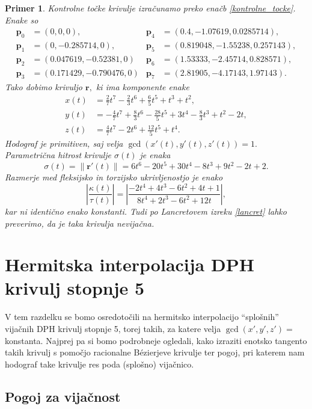 \documentclass[12pt,a4paper,twoside]{article}
\theoremstyle{definition} %
\theoremstyle{plain} %
\theoremstyle{primerstyle}
\newtheorem{primer}[definicija]{Primer}
\numberwithin{equation}{section}  %
\newcommand{\pV}{\mathbf{p}}
\newcommand{\rV}{\mathbf{r}}
\begin{document}
\begin{primer}
	Kontrolne točke krivulje izračunamo preko enačb \eqref{kontrolne_tocke}. Enake so
	\begin{align*}
		\pV_0&=(0,0,0),&\pV_4&=(0.4, -1.07619, 0.0285714),\\
		\pV_1&=(0, -0.285714, 0),&\pV_5&=(0.819048, -1.55238, 0.257143),\\
		\pV_2&=(0.047619, -0.52381, 0)&\pV_6&=(1.53333, -2.45714, 0.828571),\\
		\pV_3&=(0.171429, -0.790476, 0)&\pV_7&=(2.81905, -4.17143, 1.97143).
	\end{align*}
	Tako dobimo krivuljo $\rV,$ ki ima komponente enake
	\begin{align*}
		x(t)&=\frac{2}{7}t^7-\frac{2}{3}t^6+\frac{6}{5}t^5+t^3+t^2,\\
		y(t)&=-\frac{4}{7}t^7+\frac{8}{3}t^6-\frac{28}{5}t^5+3t^4-\frac{8}{3}t^3+t^2-2t,\\
		z(t)&=\frac{4}{7}t^7-2t^6+\frac{12}{5}t^5+t^4.
	\end{align*}
	Hodograf je primitiven, saj velja $\gcd(x'(t),y'(t),z'(t))=1.$ Parametrična hitrost krivulje $\sigma(t)$ je enaka
	\begin{equation*}
		\sigma(t)=\lVert\rV'(t)\rVert=6t^6-20t^5+30t^4-8t^3+9t^2-2t+2.
	\end{equation*}
	Razmerje med fleksijsko in torzijsko ukrivljenostjo je enako
	\begin{equation*}
		\left|\frac{\kappa(t)}{\tau(t)}\right|=\left|\frac{-2t^4+4t^3-6t^2+4t+1}{8t^4+2t^3-6t^2+12t}\right|,
	\end{equation*}
	kar ni identično enako konstanti. Tudi po Lancretovem izreku \ref{lancret} lahko preverimo, da je taka krivulja nevijačna.
\end{primer}

\section{Hermitska interpolacija DPH krivulj stopnje 5}

V tem razdelku se bomo osredotočili na hermitsko interpolacijo ``splošnih'' vijačnih DPH krivulj stopnje 5, torej takih, za katere velja $\gcd(x',y',z')=$ konstanta. Najprej pa si bomo podrobneje ogledali, kako izraziti enotsko tangento takih krivulj s pomočjo racionalne Bézierjeve krivulje ter pogoj, pri katerem nam hodograf take krivulje res poda (splošno) vijačnico.

\subsection{Pogoj za vijačnost}
\end{document}
